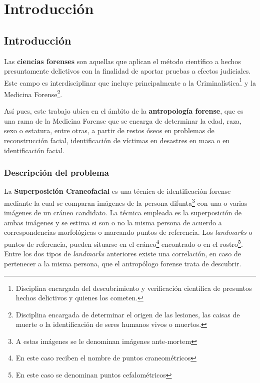 
\chapter{Introducción}


\section{Introducción}

Las \textbf{ciencias forenses} son aquellas que aplican el método científico a hechos presuntamente delictivos con la finalidad de aportar pruebas a efectos judiciales. Este campo es interdisciplinar que incluye principalmente a la Criminalística\footnote{Disciplina encargada del descubrimiento y verificación científica de presuntos hechos delictivos y quienes los cometen.} y la Medicina Forense\footnote{Disciplina encargada de determinar el origen de las lesiones, las caisas de muerte o la identificación de seres humanos vivos o muertos.}. 

\medskip

\noindent Así pues, este trabajo ubica en el ámbito de la \textbf{antropología forense}, que es una rama de la Medicina Forense que se encarga de determinar la edad, raza, sexo o estatura, entre otras, a partir de restos óseos en problemas de reconstrucción facial, identificación de víctimas en desastres en masa o en identificación facial. 


\subsection{Descripción del problema}

La \textbf{Superposición Craneofacial} es una técnica de identificación forense mediante la cual se comparan imágenes de la persona difunta\footnote{A estas imágenes se le denominan imágenes ante-mortem} con una o varias imágenes de un cráneo candidato. La técnica empleada es la superposición de ambas imágenes y se estima si son o no la misma persona de acuerdo a correspondencias morfológicas o marcando puntos de referencia. Los \textit{landmarks} o puntos de referencia, pueden situarse en el cráneo\footnote{En este caso reciben el nombre de puntos craneométricos} encontrado o en el rostro\footnote{En este caso se denominan puntos cefalométricos}. Entre los dos tipos de \textit{landmarks} anteriores existe una correlación, en caso de pertenecer a la misma persona, que el antropólogo forense trata de descubrir. 

